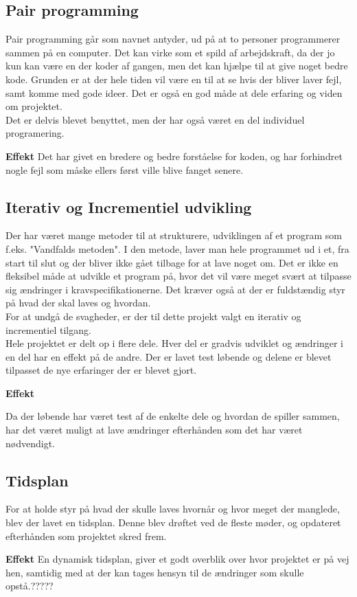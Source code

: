 \subsection{Pair programming}

Pair programming går som navnet antyder, ud på at to personer programmerer sammen på en computer. Det kan virke som et spild af arbejdskraft, da der jo kun kan være en der koder af gangen, men det kan hjælpe til at give noget bedre kode. Grunden er at der hele tiden vil være en til at se hvis der bliver laver fejl, samt komme med gode ideer. Det er også en god måde at dele erfaring og viden om projektet.\\

Det er delvis blevet benyttet, men der har også været en del individuel programering.

\textbf {Effekt}
Det har givet en bredere og bedre forståelse for koden, og har forhindret nogle fejl som måske ellers først ville blive fanget senere.



\subsection{Iterativ og Incrementiel udvikling}
Der har været mange metoder til at strukturere, udviklingen af et program som f.eks. "Vandfalds metoden". I den metode, laver man hele programmet ud i et, fra start til slut og der bliver ikke gået tilbage for at lave noget om. Det er ikke en fleksibel måde at udvikle et program på, hvor det vil være meget svært at tilpasse sig ændringer i kravspecifikationerne. Det kræver også at der er fuldstændig styr på hvad der skal laves og hvordan.\\

For at undgå de svagheder, er der til dette projekt valgt en iterativ og incrementiel tilgang.\\
Hele projektet er delt op i flere dele. Hver del er gradvis udviklet og ændringer i en del har en effekt på de andre. Der er lavet test løbende og delene er blevet tilpasset de nye erfaringer der er blevet gjort.


\textbf{Effekt}

Da der løbende har været test af de enkelte dele og hvordan de spiller sammen, har det været muligt at lave ændringer efterhånden som det har været nødvendigt.\\


\subsection{Tidsplan}
For at holde styr på hvad der skulle laves hvornår og hvor meget der manglede, blev der lavet en tidsplan. Denne blev drøftet ved de fleste møder, og opdateret efterhånden som projektet skred frem.

\textbf{Effekt}
En dynamisk tidsplan, giver et godt overblik over hvor projektet er på vej hen, samtidig med at der kan tages hensyn til de ændringer som skulle opstå.?????


